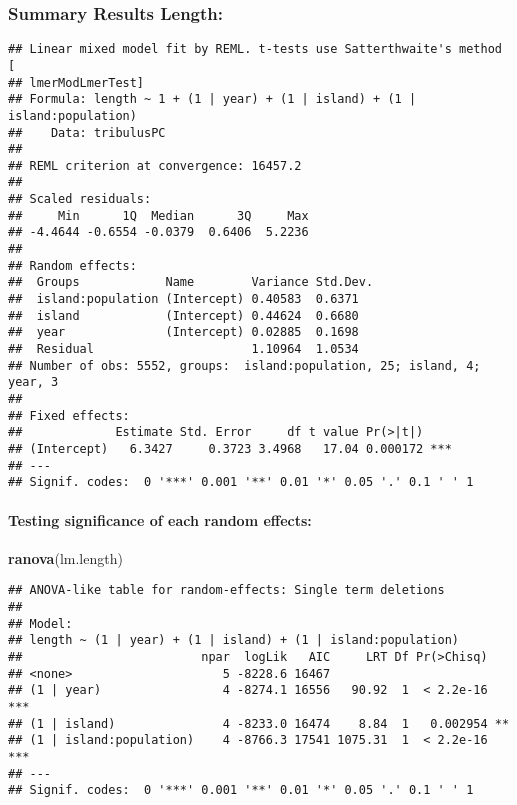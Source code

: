 \documentclass[
]{article}
\newenvironment{Shaded}{\begin{snugshade}}{\end{snugshade}}
\newcommand{\KeywordTok}[1]{\textcolor[rgb]{0.13,0.29,0.53}{\textbf{#1}}}
\newcommand{\NormalTok}[1]{#1}
\begin{document}
\hypertarget{summary-results-length}{%
\subsubsection{Summary Results Length:}\label{summary-results-length}}

\begin{verbatim}
## Linear mixed model fit by REML. t-tests use Satterthwaite's method [
## lmerModLmerTest]
## Formula: length ~ 1 + (1 | year) + (1 | island) + (1 | island:population)
##    Data: tribulusPC
## 
## REML criterion at convergence: 16457.2
## 
## Scaled residuals: 
##     Min      1Q  Median      3Q     Max 
## -4.4644 -0.6554 -0.0379  0.6406  5.2236 
## 
## Random effects:
##  Groups            Name        Variance Std.Dev.
##  island:population (Intercept) 0.40583  0.6371  
##  island            (Intercept) 0.44624  0.6680  
##  year              (Intercept) 0.02885  0.1698  
##  Residual                      1.10964  1.0534  
## Number of obs: 5552, groups:  island:population, 25; island, 4; year, 3
## 
## Fixed effects:
##             Estimate Std. Error     df t value Pr(>|t|)    
## (Intercept)   6.3427     0.3723 3.4968   17.04 0.000172 ***
## ---
## Signif. codes:  0 '***' 0.001 '**' 0.01 '*' 0.05 '.' 0.1 ' ' 1
\end{verbatim}

\hypertarget{testing-significance-of-each-random-effects}{%
\paragraph{Testing significance of each random
effects:}\label{testing-significance-of-each-random-effects}}

\begin{Shaded}
\begin{Highlighting}[]
\KeywordTok{ranova}\NormalTok{(lm.length)}
\end{Highlighting}
\end{Shaded}

\begin{verbatim}
## ANOVA-like table for random-effects: Single term deletions
## 
## Model:
## length ~ (1 | year) + (1 | island) + (1 | island:population)
##                         npar  logLik   AIC     LRT Df Pr(>Chisq)    
## <none>                     5 -8228.6 16467                          
## (1 | year)                 4 -8274.1 16556   90.92  1  < 2.2e-16 ***
## (1 | island)               4 -8233.0 16474    8.84  1   0.002954 ** 
## (1 | island:population)    4 -8766.3 17541 1075.31  1  < 2.2e-16 ***
## ---
## Signif. codes:  0 '***' 0.001 '**' 0.01 '*' 0.05 '.' 0.1 ' ' 1
\end{verbatim}
\end{document}
